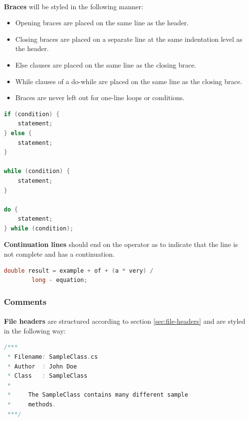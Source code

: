 \documentclass{article}
\begin{document}
    \paragraph{}
    \textbf{Braces} will be styled in the following manner:
    \begin{itemize}
        \item Opening braces are placed on the same line as the header.
        \item Closing braces are placed on a separate line at the same
                indentation level as the header.
        \item Else clauses are placed on the same line as the closing brace.
        \item While clauses of a do-while are placed on the same line as the
                closing brace.
        \item Braces are never left out for one-line loops or conditions.
    \end{itemize}

    \begin{lstlisting}[language=Java]
if (condition) {
    statement;
} else {
    statement;
}

while (condition) {
    statement;
}

do {
    statement;
} while (condition);
    \end{lstlisting}

    \textbf{Continuation lines} should end on the operator as to indicate that
    the line is not complete and has a continuation.

    \begin{lstlisting}[language=Java]
double result = example + of + (a * very) / 
        long - equation;
    \end{lstlisting}

    \subsubsection{Comments}
    \label{sec:cs-com}

    \paragraph{}
    \textbf{File headers} are structured according to section
    \ref{sec:file-headers} and are styled in the following way:

    \begin{lstlisting}[language=Java]
/***
 * Filename: SampleClass.cs
 * Author  : John Doe
 * Class   : SampleClass
 *
 *     The SampleClass contains many different sample
 *     methods.
 ***/
    \end{lstlisting}
\end{document}
